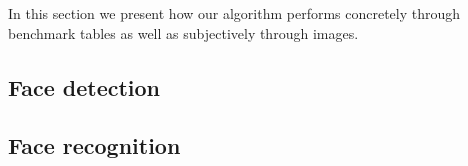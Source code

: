 In this section we present how our algorithm performs concretely through benchmark tables as well as subjectively through images.

\subsection{Face detection}


\subsection{Face recognition}

